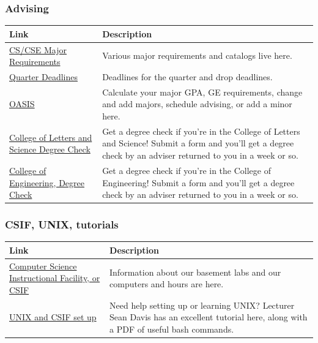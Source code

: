 \documentclass{article}
\begin{document}
\subsubsection{Advising}
\begin{center}
\begin{tabular}{p{6cm} p{8cm}}
  \toprule
\textbf{Link} & \textbf{Description} \\
  \midrule
\href{https://www.cs.ucdavis.edu/undergraduate/cs-major/}{CS/CSE Major Requirements} & Various major requirements and catalogs live here. \\
\href{https://registrar.ucdavis.edu/calendar/quarter.cfm}{Quarter Deadlines} & Deadlines for the quarter and drop deadlines. \\
\href{https://students.ucdavis.edu/}{OASIS} & Calculate your major GPA, GE requirements, change and add majors, schedule advising, or add a minor here.\\
\href{https://ls.ucdavis.edu/advising/academic-advising/degree-check-request.php}{College of Letters and Science Degree Check} & Get a degree check if you're in the College of Letters and Science! Submit a form and you'll get a degree check by an adviser returned to you in a week or so.\\
\href{https://engineering.ucdavis.edu/undergraduate/advising-q-a/#a13}{College of Engineering, Degree Check} & Get a degree check if you're in the College of Engineering! Submit a form and you'll get a degree check by an adviser returned to you in a week or so.\\
  \bottomrule
\end{tabular}
\end{center}

\subsubsection{CSIF, UNIX, tutorials}
\begin{center}
\begin{tabular}{p{6cm} p{8cm}}
  \toprule
  \textbf{Link} & \textbf{Description} \\
  \midrule
  \href{http://csifdocs.cs.ucdavis.edu/}{Computer Science Instructional Facility, or CSIF}
                & Information about our basement labs and our computers and hours
                  are here. \\
  \href{http://csiflabs.cs.ucdavis.edu/~ssdavis/30/UnixWorkshop.pdf}{UNIX and CSIF set up}
                & Need help setting up or learning UNIX? Lecturer Sean Davis has
                  an excellent tutorial here, along with a PDF of useful bash
                  commands. \\
  \bottomrule
\end{tabular}
\end{center}
\end{document}
